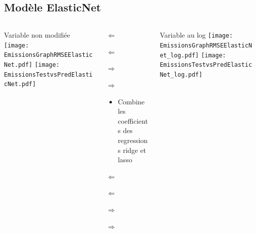 \documentclass[8pt,aspectratio=169,hyperref={unicode=true}]{beamer}
\begin{document}
\subsection{Modèle ElasticNet}
\begin{frame}{\insertsubsection}
  \begin{columns}[t]
    \begin{column}{.33\textwidth}
      \centering Variable non modifiée
      \texttt{[image: EmissionsGraphRMSEElasticNet.pdf]}
      \texttt{[image: EmissionsTestvsPredElasticNet.pdf]}
    \end{column}
    \begin{column}{.33\textwidth}
      $\Longleftarrow$

      {\footnotesize
          }

      \raggedright
      $\Longleftarrow$

      \raggedleft
      $\Longrightarrow$

      {\footnotesize
          }

      \raggedleft
      $\Longrightarrow$

      \raggedright
      \begin{itemize}
        \item Combine les coefficients des regressions ridge et lasso
      \end{itemize}

      $\Longleftarrow$
      {\scriptsize \centering
          }

      $\Longleftarrow$

      \raggedleft
      $\Longrightarrow$

      {\scriptsize \centering
          
        }
      \raggedleft
      $\Longrightarrow$
    \end{column}
    \begin{column}{.33\textwidth}
      \centering Variable au log
      \texttt{[image: EmissionsGraphRMSEElasticNet\_log.pdf]}
      \texttt{[image: EmissionsTestvsPredElasticNet\_log.pdf]}
    \end{column}
  \end{columns}
\end{frame}
\end{document}
